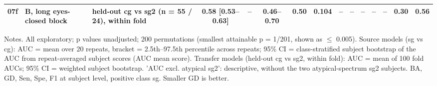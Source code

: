 \begin{table}[htbp]
{\begin{tabular}{lp{2.6cm}p{2.6cm}cccccccccccc}
07f & B, long eyes-closed block & held-out cg vs sg2 (n = 55 / 24), within fold & 0.58 [0.53--0.63] & -- & 0.46--0.70 & 0.50 & 0.104 & -- & -- & -- & -- & -- & 0.30 & 0.56 \\
\bottomrule
\end{tabular}
}
\par\smallskip
\begin{minipage}{\textwidth}\raggedright\scriptsize
Notes. All exploratory; p values unadjusted; 200 permutations (smallest attainable p = 1/201, shown as $\leq$ 0.005). Source models (sg vs cg): AUC = mean over 20 repeats, bracket = 2.5th--97.5th percentile across repeats; 95\% CI = class-stratified subject bootstrap of the AUC from repeat-averaged subject scores (AUC mean score). Transfer models (held-out cg vs sg2, within fold): AUC = mean of 100 fold AUCs; 95\% CI = weighted subject bootstrap. 'AUC excl. atypical sg2': descriptive, without the two atypical-spectrum sg2 subjects. BA, GD, Sen, Spe, F1 at subject level, positive class sg. Smaller GD is better.
\end{minipage}
\end{table}
